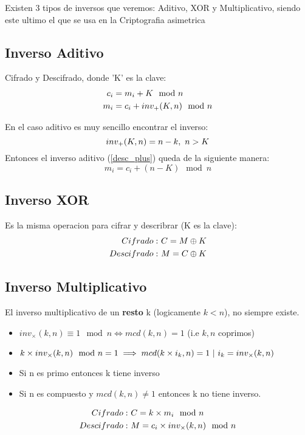 \documentclass{article}
\begin{document}
Existen 3 tipos de inversos que veremos: Aditivo, XOR y Multiplicativo, siendo este ultimo
el que se usa en la Criptografia asimetrica

\subsection{Inverso Aditivo}
Cifrado y Descifrado, donde 'K' es la clave:
\begin{align}
    \notag c_{i} &= m_{i} + K \mod n\\
    \label{desc_plus}
    m_{i} &= c_{i} + inv_{+}(K,n) \mod n
\end{align}

En el caso aditivo es muy sencillo encontrar el inverso:
$$inv_{+}(K,n) = n-k, \,\, n > K$$
Entonces el inverso aditivo (\ref{desc_plus}) queda de la siguiente manera:
$$m_{i} = c_{i} + (n-K) \mod n$$

\subsection{Inverso XOR}
Es la misma operacion para cifrar y describrar (K es la clave):
\begin{align}
    \notag Cifrado:& \,\, C = M \oplus  K\\
    \notag Descifrado:& \,\, M = C \oplus K
\end{align}

\subsection{Inverso Multiplicativo}
El inverso multiplicativo de un \textbf{resto} k (logicamente $k<n$), no siempre existe.

\begin{itemize}
    \item $inv_{\times}(k,n) \equiv 1 \mod n \iff mcd(k,n) = 1$ (i.e $k, n$ coprimos)
    \item $k \times inv_{\times}(k,n) \mod n = 1 \implies mcd(k \times i_{k}, n) = 1 \,\, \vert \,\, i_{k} = inv_{\times}(k, n)$
    \item Si n es primo entonces k tiene inverso
    \item Si n es compuesto y $mcd(k, n) \neq 1$ entonces k no tiene
    inverso.
\end{itemize}

\begin{align}
    \notag Cifrado:& \,\, C = k \times m_{i} \mod n\\
    \notag Descifrado:& \,\, M = c_{i} \times inv_{\times}(k,n) \mod n
\end{align}
\end{document}
